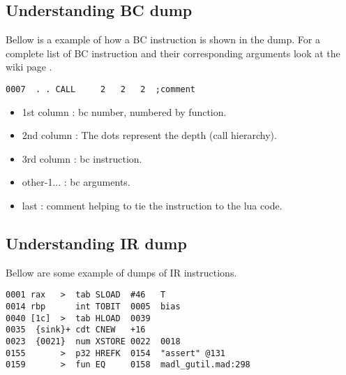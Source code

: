 
\subsection{Understanding BC dump}
\label{Subsec:dump-bc}

Bellow is a example of how a BC instruction is shown in the dump. For a complete
list of BC instruction and their corresponding arguments look at the wiki page
\cite{luajit-bc}.
\begin{verbatim}
0007  . . CALL     2   2   2  ;comment
\end{verbatim}
\begin{itemize}
  \item 1st column : bc number, numbered by function.
  \item 2nd column : The dots represent the depth (call hierarchy).
  \item 3rd column : bc instruction.
  \item other-1... : bc arguments.
  \item last       : comment helping to tie the instruction to the lua code.
\end{itemize}


\subsection{Understanding IR dump}
\label{Subsec:dump-ir}

Bellow are some example of dumps of IR instructions.
\begin{verbatim}
0001 rax   >  tab SLOAD  #46   T
0014 rbp      int TOBIT  0005  bias
0040 [1c]  >  tab HLOAD  0039
0035  {sink}+ cdt CNEW   +16
0023  {0021}  num XSTORE 0022  0018
0155       >  p32 HREFK  0154  "assert" @131
0159       >  fun EQ     0158  madl_gutil.mad:298
\end{verbatim}

